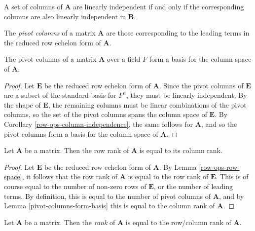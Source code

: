 \documentclass[12pt]{article}
\begin{document}
\begin{cor}\label{row-ops-column-independence}
    A set of columns of $\boldsymbol{A}$ are linearly independent if and only if the corresponding columns are also linearly independent in $\boldsymbol{B}$.
\end{cor}

\begin{defn}
    The \emph{pivot columns} of a matrix $\boldsymbol{A}$ are those corresponding to the leading terms in the reduced row echelon form of $\boldsymbol{A}$.
\end{defn}

\begin{lemma}\label{pivot-columns-form-basis}
    The pivot columns of a matrix $\boldsymbol{A}$ over a field $F$ form a basis for the column space of $\boldsymbol{A}$.
\end{lemma}

\begin{proof}
    Let $\boldsymbol{E}$ be the reduced row echelon form of $\boldsymbol{A}$. Since the pivot columns of $\boldsymbol{E}$ are a subset of the standard basis for $F^n$, they must be linearly independent. By the shape of $\boldsymbol{E}$, the remaining columns must be linear combinations of the pivot columns, so the set of the pivot columns spans the column space of $\boldsymbol{E}$. By Corollary \ref{row-ops-column-independence}, the same follows for $\boldsymbol{A}$, and so the pivot columns form a basis for the column space of $\boldsymbol{A}$.
\end{proof}

\begin{thm}
    Let $\boldsymbol{A}$ be a matrix. Then the row rank of $\boldsymbol{A}$ is equal to its column rank.
\end{thm}

\begin{proof}
    Let $\boldsymbol{E}$ be the reduced row echelon form of $\boldsymbol{A}$. By Lemma \ref{row-ops-row-space}, it follows that the row rank of $\boldsymbol{A}$ is equal to the row rank of $\boldsymbol{E}$. This is of course equal to the number of non-zero rows of $\boldsymbol{E}$, or the number of leading terms. By definition, this is equal to the number of pivot columns of $\boldsymbol{A}$, and by Lemma \ref{pivot-columns-form-basis} this is equal to the column rank of $\boldsymbol{A}$.
\end{proof}

\begin{defn}
    Let $\boldsymbol{A}$ be a matrix. Then the \emph{rank} of $\boldsymbol{A}$ is equal to the row/column rank of $\boldsymbol{A}$.
\end{defn}
\end{document}
